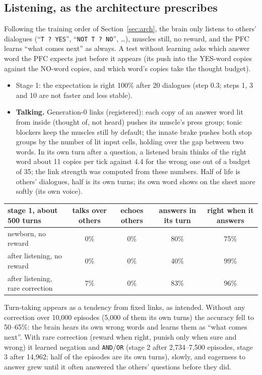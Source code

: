 \documentclass[11pt]{article}
\begin{document}
\subsection{Listening, as the architecture prescribes}
Following the training order of Section~\ref{sec:arch}, the brain only listens to others' dialogues (``\texttt{T ? YES}'',
``\texttt{NOT T ? NO}'', \dots), muscles still, no reward, and the PFC learns ``what comes next'' as always. A test without
learning asks which answer word the PFC expects just before it appears (its push into the YES-word copies against the
NO-word copies, and which word's copies take the thought budget).
\begin{itemize}
\item Stage 1: the expectation is right 100\% after 20 dialogues (step 0.3; steps 1, 3 and 10 are not faster and less
stable).
\item \textbf{Talking.} Generation-0 links (registered): each copy of an answer word lit from inside (thought of, not
heard) pushes its muscle's press group; tonic blockers keep the muscles still by default; the innate brake pushes both
stop groups by the number of lit input cells, holding over the gap between two words. In its own turn after a question,
a listened brain thinks of the right word about 11 copies per tick against 4.4 for the wrong one out of a budget of 35; the
link strength was computed from these numbers. Half of life is others' dialogues, half is its own turns; its own word shows
on the sheet more softly (its own voice).
\end{itemize}
\begin{center}\small
\begin{tabular}{lcccc}
\toprule
stage 1, about 500 turns & talks over others & echoes others & answers in its turn & right when it answers\\
\midrule
newborn, no reward & 0\% & 0\% & 80\% & 75\%\\
after listening, no reward & 0\% & 0\% & 40\% & 99\%\\
after listening, rare correction & 7\% & 0\% & 83\% & 96\%\\
\bottomrule
\end{tabular}
\end{center}
Turn-taking appears as a tendency from fixed links, as intended. Without any correction over 10,000 episodes (5,000 of
them its own turns) the accuracy fell to 50--65\%: the brain hears its own wrong words and learns them as ``what comes next''. With rare correction (reward when
right, punish only when sure and wrong) it learned negation and \texttt{AND}/\texttt{OR} (stage 2 after 2,734--7,500 episodes,
stage 3 after 14,962; half of the episodes are its own turns), slowly, and eagerness to answer grew until it often answered the others' questions before they did.
\end{document}
